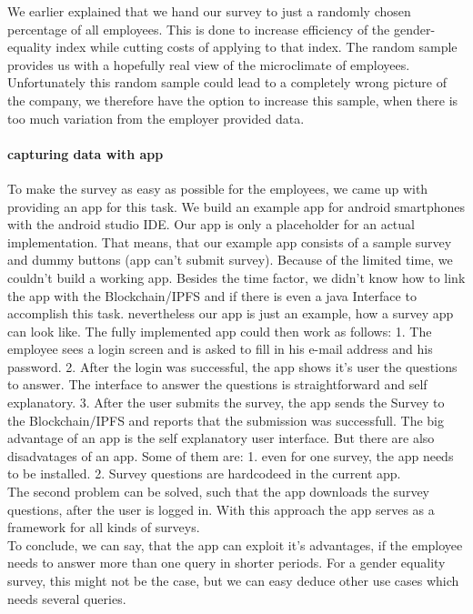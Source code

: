 We earlier explained that we hand our survey to just a randomly chosen percentage of all employees. This is done to increase efficiency of the gender-equality index while cutting costs of applying to that index. The random sample provides us with a hopefully real view of the microclimate of employees. Unfortunately this random sample could lead to a completely wrong picture of the company, we therefore have the option to increase this sample, when there is too much variation from the employer provided data.\\

\paragraph*{capturing data with app}
To make the survey as easy as possible for the employees, we came up with providing an app for this task. We build an example app for android smartphones with the android studio IDE. Our app is only a placeholder for an actual implementation. That means, that our example app consists of a sample survey and dummy buttons (app can't submit survey). Because of the limited time, we couldn't build a working app. Besides the time factor, we didn't know how to link the app with the Blockchain/IPFS and if there is even a java Interface to accomplish this task. nevertheless our app is just an example, how a survey app can look like. The fully implemented app could then work as follows: 1. The employee sees a login screen and is asked to fill in his e-mail address and his password. 2. After the login was successful, the app shows it's user the questions to answer. The interface to answer the questions is straightforward and self explanatory. 3. After the user submits the survey, the app sends the Survey to the Blockchain/IPFS and reports that the submission was successfull. The big advantage of an app is the self explanatory user interface. But there are also disadvatages of an app. Some of them are: 1. even for one survey, the app needs to be installed. 2. Survey questions are hardcodeed in the current app. \\
The second problem can be solved, such that the app downloads the survey questions, after the user is logged in. With this approach the app serves as a framework for all kinds of surveys. \\
To conclude, we can say, that the app can exploit it's advantages, if the employee needs to answer more than one query in shorter periods. For a gender equality survey, this might not be the case, but we can easy deduce other use cases which needs several queries.\\

